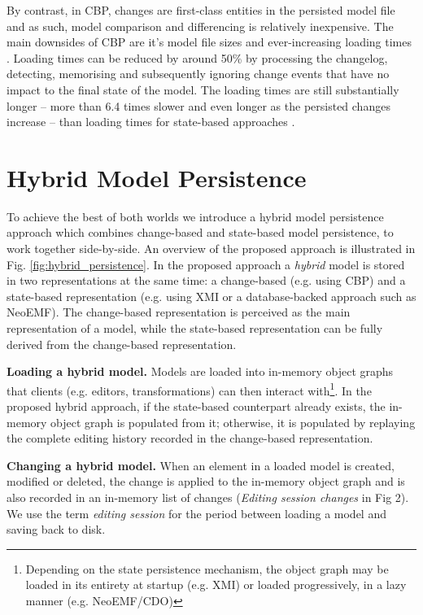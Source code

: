 By contrast, in CBP, changes are first-class entities in the persisted model file and as such, model comparison and differencing is relatively inexpensive. The main downsides of CBP are it's model file sizes \cite{DBLP:journals/entcs/RobbesL07,DBLP:conf/edoc/KoegelHLHD10} and ever-increasing loading times \cite{mens2002state}. Loading times can be reduced by around 50\% by processing the changelog, detecting, memorising and subsequently ignoring change events that have no impact to the final state of the model. The loading times are still substantially longer -- more than 6.4 times slower and even longer as the persisted changes increase -- than loading times for state-based approaches \cite{yohannis2018towards}. 

\vspace{-15pt}
\section{Hybrid Model Persistence}
\label{sec:hybrid_model_persistence}

\vspace{-15pt}
To achieve the best of both worlds we introduce a hybrid model persistence approach which combines change-based and state-based model persistence, to work together side-by-side. An overview of the proposed approach is illustrated in Fig. \ref{fig:hybrid_persistence}. In the proposed approach a \textit{hybrid} model is stored in two representations at the same time: a change-based (e.g. using CBP) and a state-based representation (e.g. using XMI or a database-backed approach such as NeoEMF). The change-based representation is perceived as the main representation of a model, while the state-based representation can be fully derived from the change-based representation.

\textbf{Loading a hybrid model.} Models are loaded into in-memory object graphs that clients (e.g. editors, transformations) can then interact with\footnote{Depending on the state persistence mechanism, the object graph may be loaded in its entirety at startup (e.g. XMI) or loaded progressively, in a lazy manner (e.g. NeoEMF/CDO)}. In the proposed hybrid approach, if the state-based counterpart already exists, the in-memory object graph is populated from it; otherwise, it is populated by replaying the complete editing history recorded in the change-based representation.

\textbf{Changing a hybrid model.} When an element in a loaded model is created, modified or deleted, the change is applied to the in-memory object graph and is also recorded in an in-memory list of changes (\textit{Editing session changes} in Fig 2). We use the term \emph{editing session} for the period between loading a model and saving back to disk. 

